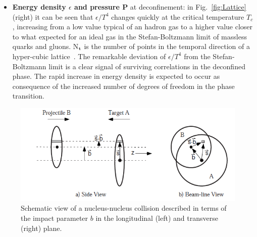 \begin{itemize}
\item \textbf{Energy density $\epsilon$ and pressure P} at deconfinement: 
in Fig.~\ref{fig:Lattice} (right) it 
can be seen that $\epsilon/T^4$ changes quickly at the critical temperature 
$T_c$, increasing from a low 
value typical of an hadron gas to a higher value closer to what expected 
for an ideal gas in the Stefan-Boltzmann limit of 
massless quarks and gluons. N$_{\rm t}$ is the number of points in the temporal
direction of a hyper-cubic lattice~\cite{Borsanyi:2010cj}. The 
remarkable deviation of $\epsilon/T^4$ from the
Stefan-Boltzmann limit is a clear signal of surviving
correlations in the deconfined phase.
The rapid increase in energy density is expected to occur as consequence of the increased number of degrees of 
freedom in the phase transition. %

\end{itemize}


\begin{figure}[!b]
  \centering
  \includegraphics[width=12cm]{FigCap1/glauber.png}
  \caption{Schematic view of a nucleus-nucleus collision described in terms of the impact parameter $b$ in the longitudinal (left) and transverse (right) plane.}
  \label{fig:image10}
\end{figure}

